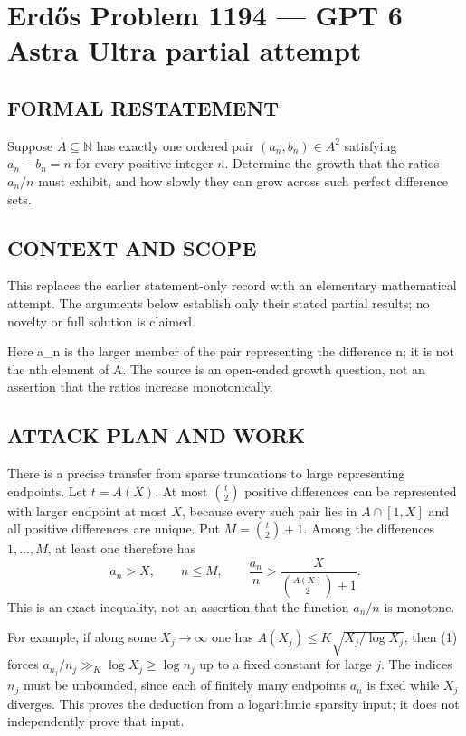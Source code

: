\section*{Erd\H{o}s Problem 1194 --- GPT 6 Astra Ultra partial attempt}


\subsection*{FORMAL RESTATEMENT}
Suppose $A\subseteq\mathbb N$ has exactly one ordered pair $(a_n,b_n)\in A^2$ satisfying $a_n-b_n=n$ for every positive integer $n$. Determine the growth that the ratios $a_n/n$ must exhibit, and how slowly they can grow across such perfect difference sets.

\subsection*{CONTEXT AND SCOPE}
This replaces the earlier statement-only record with an elementary mathematical attempt. The arguments below establish only their stated partial results; no novelty or full solution is claimed.

Here a_n is the larger member of the pair representing the difference n; it is not the nth element of A. The source is an open-ended growth question, not an assertion that the ratios increase monotonically.

\subsection*{ATTACK PLAN AND WORK}
There is a precise transfer from sparse truncations to large representing
endpoints. Let $t=A(X)$. At most $\binom t2$ positive differences can be
represented with larger endpoint at most $X$, because every such pair lies in
$A\cap[1,X]$ and all positive differences are unique. Put
$M=\binom t2+1$. Among the differences $1,\ldots,M$, at least one therefore has
\[a_n>X,\qquad n\le M,\qquad \frac{a_n}{n}>\frac X{\binom{A(X)}2+1}.\tag{1}\]
This is an exact inequality, not an assertion that the function $a_n/n$ is monotone.

For example, if along some $X_j\to\infty$ one has
$A(X_j)\le K\sqrt{X_j/\log X_j}$, then (1) forces
$a_{n_j}/n_j\gg_K\log X_j\ge\log n_j$ up to a fixed constant for large $j$.
The indices $n_j$ must be unbounded, since each of finitely many endpoints
$a_n$ is fixed while $X_j$ diverges. This proves the deduction from a logarithmic
sparsity input; it does not independently prove that input.

